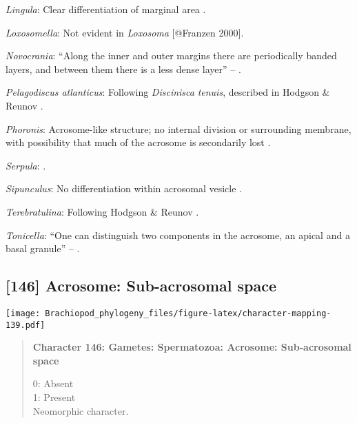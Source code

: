 \documentclass[openany]{book}
\theoremstyle{definition}
\theoremstyle{definition}
\theoremstyle{definition}
\theoremstyle{remark}
\begin{document}
\hypertarget{Lingula-coding-145}{}
\emph{Lingula}: Clear differentiation of marginal area
\citep{Fukumoto2003Theacrosome}.

\hypertarget{Loxosomella-coding-145}{}
\emph{Loxosomella}: Not evident in \emph{Loxosoma} {[}@Franzen 2000{]}.

\hypertarget{Novocrania-coding-145}{}
\emph{Novocrania}: ``Along the inner and outer margins there are
periodically banded layers, and between them there is a less dense
layer'' -- \citet{Afzelius1978Finestructure}.

\hypertarget{Pelagodiscus_atlanticus-coding-145}{}
\emph{Pelagodiscus atlanticus}: Following \emph{Discinisca}
\emph{tenuis}, described in Hodgson \& Reunov
\citeyearpar{Hodgson1994Ultrastructureof}.

\hypertarget{Phoronis-coding-145}{}
\emph{Phoronis}: Acrosome-like structure; no internal division or
surrounding membrane, with possibility that much of the acrosome is
secondarily lost \citep{Reunov2004Ultrastructuralstudy}.

\hypertarget{Serpula-coding-145}{}
\emph{Serpula}: \citet{Gherardi2011}.

\hypertarget{Sipunculus-coding-145}{}
\emph{Sipunculus}: No differentiation within acrosomal vesicle
\citep{Rice1993}.

\hypertarget{Terebratulina-coding-145}{}
\emph{Terebratulina}: Following Hodgson \& Reunov
\citeyearpar{Hodgson1994Ultrastructureof}.

\hypertarget{Tonicella-coding-145}{}
\emph{Tonicella}: ``One can distinguish two components in the acrosome,
an apical and a basal granule'' -- \citet{BucklandNicks1988}.

\subsection*{{[}146{]} Acrosome: Sub-acrosomal
space}\label{acrosome-sub-acrosomal-space}

\texttt{[image: Brachiopod\_phylogeny\_files/figure-latex/character-mapping-139.pdf]}

\begin{quote}
\textbf{Character 146: Gametes: Spermatozoa: Acrosome: Sub-acrosomal
space}

0: Absent\\
1: Present\\
Neomorphic character.
\end{quote}
\end{document}
